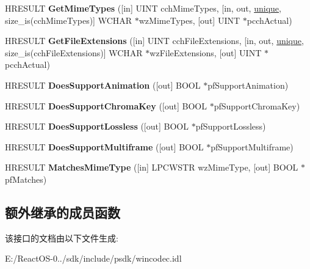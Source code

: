 \begin{DoxyCompactItemize}
\item 
\mbox{\label{interface_i_w_i_c_bitmap_codec_info_a12103d6a9c58f6765954333f3544df82}} 
H\+R\+E\+S\+U\+LT {\bfseries Get\+Mime\+Types} (\mbox{[}in\mbox{]} U\+I\+NT cch\+Mime\+Types, \mbox{[}in, out, \hyperlink{interfaceunique}{unique}, size\+\_\+is(cch\+Mime\+Types)\mbox{]} W\+C\+H\+AR $\ast$wz\+Mime\+Types, \mbox{[}out\mbox{]} U\+I\+NT $\ast$pcch\+Actual)
\item 
\mbox{\label{interface_i_w_i_c_bitmap_codec_info_a36f15e83c17064cc4d7bc56c92e95e0b}} 
H\+R\+E\+S\+U\+LT {\bfseries Get\+File\+Extensions} (\mbox{[}in\mbox{]} U\+I\+NT cch\+File\+Extensions, \mbox{[}in, out, \hyperlink{interfaceunique}{unique}, size\+\_\+is(cch\+File\+Extensions)\mbox{]} W\+C\+H\+AR $\ast$wz\+File\+Extensions, \mbox{[}out\mbox{]} U\+I\+NT $\ast$pcch\+Actual)
\item 
\mbox{\label{interface_i_w_i_c_bitmap_codec_info_a5e44276ce89ba7f43c14dfad9aa1a06e}} 
H\+R\+E\+S\+U\+LT {\bfseries Does\+Support\+Animation} (\mbox{[}out\mbox{]} B\+O\+OL $\ast$pf\+Support\+Animation)
\item 
\mbox{\label{interface_i_w_i_c_bitmap_codec_info_a8444b800734be39cfcd9d82df789db9f}} 
H\+R\+E\+S\+U\+LT {\bfseries Does\+Support\+Chroma\+Key} (\mbox{[}out\mbox{]} B\+O\+OL $\ast$pf\+Support\+Chroma\+Key)
\item 
\mbox{\label{interface_i_w_i_c_bitmap_codec_info_a6463e8a0f96ee1b823188948cc753b69}} 
H\+R\+E\+S\+U\+LT {\bfseries Does\+Support\+Lossless} (\mbox{[}out\mbox{]} B\+O\+OL $\ast$pf\+Support\+Lossless)
\item 
\mbox{\label{interface_i_w_i_c_bitmap_codec_info_a0dd4cfb01a84de1ea415095fd994e024}} 
H\+R\+E\+S\+U\+LT {\bfseries Does\+Support\+Multiframe} (\mbox{[}out\mbox{]} B\+O\+OL $\ast$pf\+Support\+Multiframe)
\item 
\mbox{\label{interface_i_w_i_c_bitmap_codec_info_a7fab349957eb9137eaba01d8d54a74e4}} 
H\+R\+E\+S\+U\+LT {\bfseries Matches\+Mime\+Type} (\mbox{[}in\mbox{]} L\+P\+C\+W\+S\+TR wz\+Mime\+Type, \mbox{[}out\mbox{]} B\+O\+OL $\ast$pf\+Matches)
\end{DoxyCompactItemize}
\subsection*{额外继承的成员函数}


该接口的文档由以下文件生成\+:\begin{DoxyCompactItemize}
\item 
E\+:/\+React\+O\+S-\/0../sdk/include/psdk/wincodec.\+idl\end{DoxyCompactItemize}
